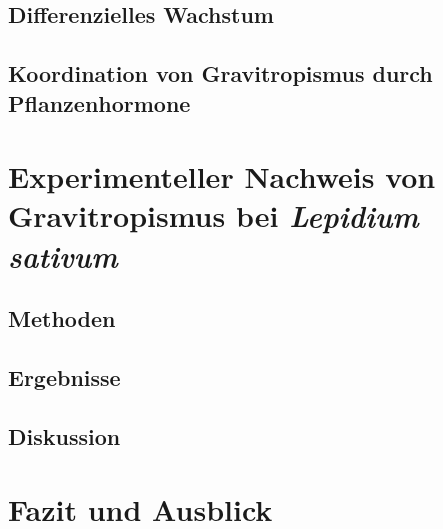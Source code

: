 \documentclass[
a4paper, 
11pt, 
ngerman,
listof=totoc,
bibliography=totocnumbered
]{scrreprt}
\begin{document}
\section{Differenzielles Wachstum}


\section{Koordination von Gravitropismus durch Pflanzenhormone}

\chapter{Experimenteller Nachweis von Gravitropismus bei \emph{Lepidium sativum}}

\section{Methoden}

\section{Ergebnisse}

\section{Diskussion}

\chapter{Fazit und Ausblick}


\printbibliography

% 
% 
% 
\end{document}

